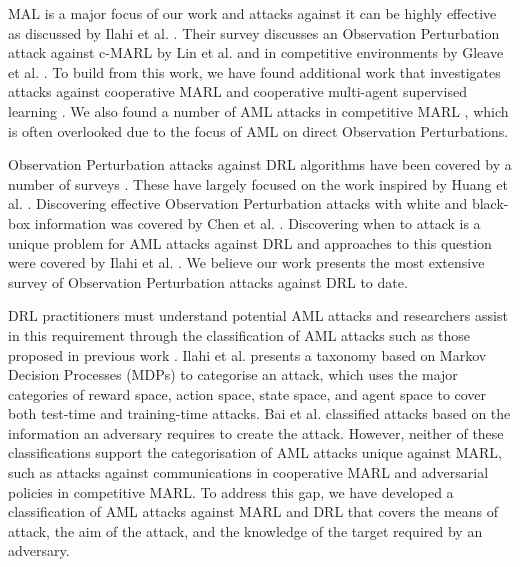 \documentclass[conference,compsoc]{IEEEtran}
\begin{document}
MAL is a major focus of our work and attacks against it can be highly effective as discussed by Ilahi et al. \cite{ilahi_challenges_2021}. Their survey discusses an Observation Perturbation attack against c-MARL by Lin et al. \cite{lin_robustness_2020} and in competitive environments by Gleave et al. \cite{gleave_adversarial_2020}. To build from this work, we have found additional work that investigates attacks against cooperative MARL \cite{lin_robustness_2020, xue_mis-spoke_2022} and cooperative multi-agent supervised learning \cite{tu_adversarial_2021}. We also found a number of AML attacks in competitive MARL \cite{fujimoto_adversarial_2021,uesato_adversarial_2018,guo_adversarial_2021,pan_improving_2021,phan_learning_2020}, which is often overlooked due to the focus of AML on direct Observation Perturbations. 

Observation Perturbation attacks against DRL algorithms have been covered by a number of surveys \cite{ilahi_challenges_2021, chen_adversarial_2019, ren_adversarial_2020}. These have largely focused on the work inspired by Huang et al. \cite{huang_adversarial_2017}. Discovering effective Observation Perturbation attacks with white and black-box information was covered by Chen et al. \cite{chen_adversarial_2019}. Discovering when to attack is a unique problem for AML attacks against DRL and approaches to this question were covered by Ilahi et al. \cite{ilahi_challenges_2021}. We believe our work presents the most extensive survey of Observation Perturbation attacks against DRL to date.


DRL practitioners must understand potential AML attacks and researchers assist in this requirement through the classification of AML attacks such as those proposed in previous work \cite{ilahi_challenges_2021, bai_recent_2021}. Ilahi et al. \cite{ilahi_challenges_2021} presents a taxonomy based on Markov Decision Processes (MDPs) to categorise an attack, which uses the major categories of reward space, action space, state space, and agent space to cover both test-time and training-time attacks. Bai et al. \cite{bai_recent_2021} classified attacks based on the information an adversary requires to create the attack. However, neither of these classifications support the categorisation of AML attacks unique against MARL, such as attacks against communications in cooperative MARL and adversarial policies in competitive MARL. To address this gap, we have developed a classification of AML attacks against MARL and DRL that covers the means of attack, the aim of the attack, and the knowledge of the target required by an adversary.
 
\end{document}
